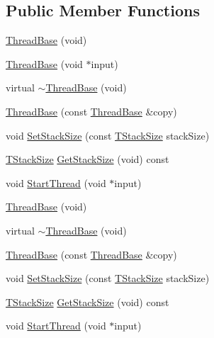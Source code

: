 \subsection*{Public Member Functions}
\begin{DoxyCompactItemize}
\item 
\hyperlink{class_thread_base_a95aa3532d57d742e9591b37c4aff1bc7}{Thread\-Base} (void)
\item 
\hyperlink{class_thread_base_a9e152f859a8ae5a8d76672f0b53da5c7}{Thread\-Base} (void $\ast$input)
\item 
virtual \hyperlink{class_thread_base_a4afe68df229298e2c2920d34ce612e0e}{$\sim$\-Thread\-Base} (void)
\item 
\hyperlink{class_thread_base_a50bd80044eb3845856abef9535f1903c}{Thread\-Base} (const \hyperlink{class_thread_base}{Thread\-Base} \&copy)
\item 
void \hyperlink{class_thread_base_add14648bdc8059dd8db41166130921dd}{Set\-Stack\-Size} (const \hyperlink{class_thread_base_af45bd74387b409e15989f7eddbaf3718}{T\-Stack\-Size} stack\-Size)
\item 
\hyperlink{class_thread_base_af45bd74387b409e15989f7eddbaf3718}{T\-Stack\-Size} \hyperlink{class_thread_base_a39e2186d3cf4ddf6b9aa533d59f56546}{Get\-Stack\-Size} (void) const 
\item 
void \hyperlink{class_thread_base_aaea6437d738ac97e3427bbe466f850f8}{Start\-Thread} (void $\ast$input)
\item 
\hyperlink{class_thread_base_a95aa3532d57d742e9591b37c4aff1bc7}{Thread\-Base} (void)
\item 
virtual \hyperlink{class_thread_base_a4afe68df229298e2c2920d34ce612e0e}{$\sim$\-Thread\-Base} (void)
\item 
\hyperlink{class_thread_base_a50bd80044eb3845856abef9535f1903c}{Thread\-Base} (const \hyperlink{class_thread_base}{Thread\-Base} \&copy)
\item 
void \hyperlink{class_thread_base_add14648bdc8059dd8db41166130921dd}{Set\-Stack\-Size} (const \hyperlink{class_thread_base_af45bd74387b409e15989f7eddbaf3718}{T\-Stack\-Size} stack\-Size)
\item 
\hyperlink{class_thread_base_af45bd74387b409e15989f7eddbaf3718}{T\-Stack\-Size} \hyperlink{class_thread_base_a39e2186d3cf4ddf6b9aa533d59f56546}{Get\-Stack\-Size} (void) const 
\item 
void \hyperlink{class_thread_base_aaea6437d738ac97e3427bbe466f850f8}{Start\-Thread} (void $\ast$input)
\end{DoxyCompactItemize}
